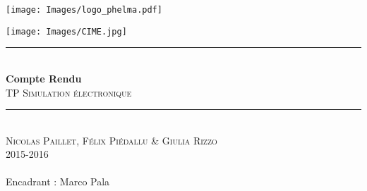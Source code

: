 \begin{titlepage}
    \vspace*{50px}
    \texttt{[image: Images/logo\_phelma.pdf]}
    \vspace*{-80px}
\begin{flushright}
    \texttt{[image: Images/CIME.jpg]}
\end{flushright}

\vspace*{2cm}

\begin{center}
\rule{\linewidth}{0.5mm}\\[0.4cm]
{\huge{\bfseries Compte Rendu}\\[0.4cm]
\textsc{TP Simulation électronique}\\[0.4cm]}
\rule{\linewidth}{0.5mm}\\[0.5cm]

\LARGE{\textsc{Nicolas Paillet, Félix Piédallu \& Giulia Rizzo}}\\[0.7cm]
\large{\textsc{2015-2016}}\\[2cm]

\Large{~}\\[1cm]
%
 \large{Encadrant : Marco Pala}\\[2cm]
%

\end{center}
\end{titlepage}

\tableofcontents        %
\newpage
{}  %
